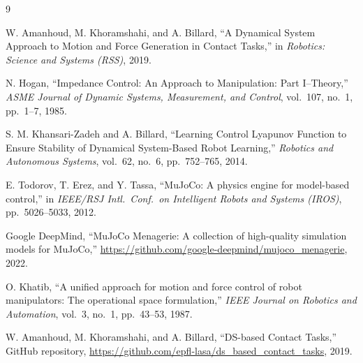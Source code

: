 \documentclass[conference]{IEEEtran}
\begin{document}
\begin{thebibliography}{9}

W. Amanhoud, M. Khoramshahi, and A. Billard,
``A Dynamical System Approach to Motion and Force Generation in Contact Tasks,''
in \emph{Robotics: Science and Systems (RSS)}, 2019.

N. Hogan,
``Impedance Control: An Approach to Manipulation: Part I--Theory,''
\emph{ASME Journal of Dynamic Systems, Measurement, and Control},
vol.~107, no.~1, pp.~1--7, 1985.

S. M. Khansari-Zadeh and A. Billard,
``Learning Control Lyapunov Function to Ensure Stability of Dynamical
System-Based Robot Learning,''
\emph{Robotics and Autonomous Systems}, vol.~62, no.~6, pp.~752--765, 2014.

E. Todorov, T. Erez, and Y. Tassa,
``MuJoCo: A physics engine for model-based control,''
in \emph{IEEE/RSJ Intl.\ Conf.\ on Intelligent Robots and Systems (IROS)},
pp.~5026--5033, 2012.

Google DeepMind,
``MuJoCo Menagerie: A collection of high-quality simulation models for MuJoCo,''
\url{https://github.com/google-deepmind/mujoco_menagerie}, 2022.

O. Khatib,
``A unified approach for motion and force control of robot manipulators:
The operational space formulation,''
\emph{IEEE Journal on Robotics and Automation},
vol.~3, no.~1, pp.~43--53, 1987.

W. Amanhoud, M. Khoramshahi, and A. Billard,
``DS-based Contact Tasks,'' GitHub repository,
\url{https://github.com/epfl-lasa/ds_based_contact_tasks}, 2019.

\end{thebibliography}
\end{document}
